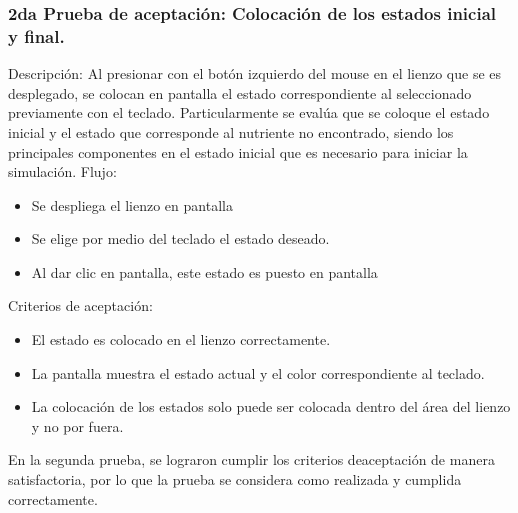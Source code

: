 \subsubsection{2da Prueba de aceptaci\'on: Colocaci\'on de los estados inicial y final.}
    Descripci\'on: Al presionar con el bot\'on izquierdo del mouse
        en el lienzo que se es desplegado, se colocan en pantalla el
        estado correspondiente al seleccionado previamente con el
        teclado. Particularmente se eval\'ua que se coloque el estado
        inicial y el estado que corresponde al nutriente no
        encontrado, siendo los principales componentes en el estado
        inicial que es necesario para iniciar la simulaci\'on.
    \vskip 0.5cm
    Flujo:
    \vskip 0.5cm
    \begin{itemize}
        \item Se despliega el lienzo en pantalla
        \item Se elige por medio del teclado el estado deseado.
        \item Al dar clic en pantalla, este estado es puesto en pantalla
    \end{itemize}
    \vskip 0.5cm
    Criterios de aceptaci\'on:
    \begin{itemize}
        \item El estado es colocado en el lienzo correctamente.
        \item La pantalla muestra el estado actual y el color
            correspondiente al teclado.
        \item La colocaci\'on de los estados solo puede ser colocada
            dentro del \'area del lienzo y no por fuera.
    \end{itemize}
    \vskip 0.5cm
        En la segunda prueba, se lograron cumplir los criterios deaceptaci\'on de manera satisfactoria, por lo que la prueba se
        considera como realizada y cumplida correctamente.
